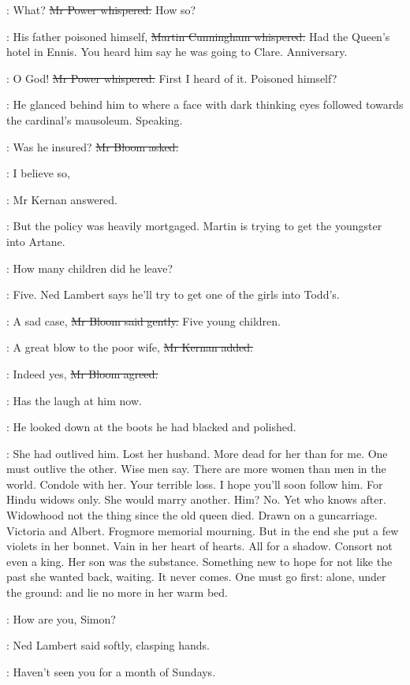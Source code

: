 \power:
What?
\sout{Mr Power whispered.}
How so?

\cunningham:
His father poisoned himself,
\sout{Martin Cunningham whispered.}
Had the Queen's hotel in Ennis.
You heard him say he was going to Clare.
Anniversary.

\power:
O God!
\sout{Mr Power whispered.}
First I heard of it.
Poisoned himself?

:
He glanced behind him to where
a face with dark thinking eyes followed towards the cardinal's mausoleum.
Speaking.

\Bloom:
Was he insured?
\sout{Mr Bloom asked.}

:
I believe so,

:
Mr Kernan answered.

:
But the policy was heavily mortgaged.
Martin is trying to get the youngster into Artane.

\Bloom:
How many children did he leave?

:
Five.
Ned Lambert says he'll try to get one of the girls into Todd's.

\Bloom:
A sad case,
\sout{Mr Bloom said gently.}
Five young children.

:
A great blow to the poor wife,
\sout{Mr Kernan added.}

\Bloom:
Indeed yes,
\sout{Mr Bloom agreed.}

\BloomInt:
Has the laugh at him now.

:
He looked down at the boots he had blacked and polished.

\BloomInt:
She had outlived him.
Lost her husband.
More dead for her than for me.
One must outlive the other.
Wise men say.
There are more women than men in the world.
Condole with her.
Your terrible loss.
I hope you'll soon follow him.
For Hindu widows only.
She would marry another.
Him?
No.
Yet who knows after.
Widowhood not the thing since the old queen died.
Drawn on a guncarriage.
Victoria and Albert.
Frogmore memorial mourning.
But in the end she put a few violets in her bonnet.
Vain in her heart of hearts.
All for a shadow.
Consort not even a king.
Her son was the substance.
Something new to hope for not like the past she wanted back, waiting.
It never comes.
One must go first:
alone, under the ground:
and lie no more in her warm bed.

\lambert:
How are you, Simon?

:
Ned Lambert said softly,
clasping hands.

\lambert:
Haven't seen you for a month of Sundays.

